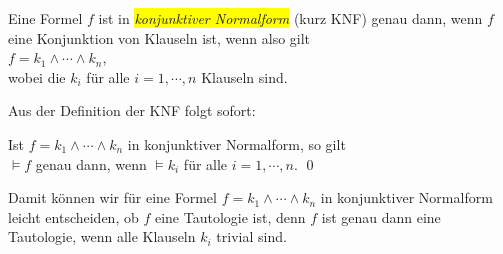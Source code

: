 \begin{Definition}  
  Eine Formel $f$ ist in \colorbox{yellow}{\emph{konjunktiver Normalform}} (kurz KNF)
  genau dann, wenn $f$ eine Konjunktion von Klauseln ist, wenn also gilt \\[0.2cm]
  \hspace*{1.3cm} $f = k_1 \wedge \cdots \wedge k_n$, \\[0.2cm]
  wobei die $k_i$ f\"{u}r alle $i=1,\cdots,n$ Klauseln sind. \eox
\end{Definition}

\noindent
Aus der Definition der KNF folgt sofort:
\begin{Korollar} \label{korollar:knf}
  Ist $f = k_1 \wedge \cdots \wedge k_n$ in konjunktiver Normalform, so gilt\\[0.2cm]
  \hspace*{1.3cm} $\models f$ \quad genau dann, wenn \quad $\models k_i$ \quad f\"{u}r alle $i=1,\cdots,n$. \qed
\end{Korollar}

Damit k\"{o}nnen wir f\"{u}r eine Formel $f = k_1 \wedge \cdots \wedge k_n$ in konjunktiver
Normalform leicht entscheiden, ob $f$ eine Tautologie ist, denn $f$ ist genau dann eine
Tautologie, wenn alle Klauseln $k_i$ trivial sind.
\vspace*{0.2cm}

